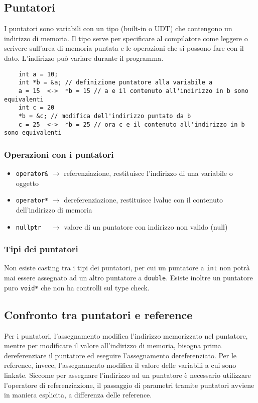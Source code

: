 \documentclass[a4paper]{article}
\begin{document}
\subsection{Puntatori}
I puntatori sono variabili con un tipo (built-in o UDT) che contengono un indirizzo di memoria. Il tipo serve per specificare al
compilatore come leggere o scrivere sull'area di memoria puntata e le operazioni che si possono fare con il dato. L'indirizzo
può variare durante il programma.
\begin{lstlisting}
	int a = 10;
	int *b = &a; // definizione puntatore alla variabile a
	a = 15  <->  *b = 15 // a e il contenuto all'indirizzo in b sono equivalenti
	int c = 20
	*b = &c; // modifica dell'indirizzo puntato da b
	c = 25  <->  *b = 25 // ora c e il contenuto all'indirizzo in b sono equivalenti
\end{lstlisting}

\subsubsection*{Operazioni con i puntatori}
\begin{itemize}
	\item \verb|operator&| \(\rightarrow\) referenziazione, restituisce l'indirizzo di una variabile o oggetto
	\item \verb|operator*| \(\rightarrow\) dereferenziazione, restituisce lvalue con il contenuto dell'indirizzo di memoria
	\item \verb|nullptr  | \(\rightarrow\) valore di un puntatore con indirizzo non valido (null)
\end{itemize}

\subsubsection*{Tipi dei puntatori}
Non esiste casting tra i tipi dei puntatori, per cui un puntatore a \verb|int| non potrà mai essere assegnato ad un altro
puntatore a \verb|double|. Esiste inoltre un puntatore puro \verb|void*| che non ha controlli sul type check.

\subsection{Confronto tra puntatori e reference}
Per i puntatori, l'assegnamento modifica l'indirizzo memorizzato nel puntatore, mentre per modificare il valore all'indirizzo
di memoria, bisogna prima dereferenziare il puntatore ed eseguire l'assegnamento dereferenziato. Per le reference, invece,
l'assegnamento modifica il valore delle variabili a cui sono linkate.
Siccome per assegnare l'indirizzo ad un puntatore è necessario utilizzare l'operatore di referenziazione, il passaggio di
parametri tramite puntatori avviene in maniera esplicita, a differenza delle reference.
\end{document}
